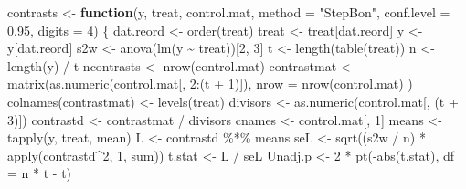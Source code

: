\documentclass[
]{book}
\newenvironment{Shaded}{\begin{snugshade}}{\end{snugshade}}
\newcommand{\AttributeTok}[1]{\textcolor[rgb]{0.77,0.63,0.00}{#1}}
\newcommand{\ControlFlowTok}[1]{\textcolor[rgb]{0.13,0.29,0.53}{\textbf{#1}}}
\newcommand{\DecValTok}[1]{\textcolor[rgb]{0.00,0.00,0.81}{#1}}
\newcommand{\FloatTok}[1]{\textcolor[rgb]{0.00,0.00,0.81}{#1}}
\newcommand{\FunctionTok}[1]{\textcolor[rgb]{0.00,0.00,0.00}{#1}}
\newcommand{\NormalTok}[1]{#1}
\newcommand{\OtherTok}[1]{\textcolor[rgb]{0.56,0.35,0.01}{#1}}
\newcommand{\SpecialCharTok}[1]{\textcolor[rgb]{0.00,0.00,0.00}{#1}}
\newcommand{\StringTok}[1]{\textcolor[rgb]{0.31,0.60,0.02}{#1}}
\begin{document}
\begin{Shaded}
\begin{Highlighting}[]
\NormalTok{contrasts }\OtherTok{\textless{}{-}} \ControlFlowTok{function}\NormalTok{(y, treat, control.mat, }\AttributeTok{method =} \StringTok{"StepBon"}\NormalTok{, }\AttributeTok{conf.level =} \FloatTok{0.95}\NormalTok{, }\AttributeTok{digits =} \DecValTok{4}\NormalTok{) \{}
\NormalTok{  dat.reord }\OtherTok{\textless{}{-}} \FunctionTok{order}\NormalTok{(treat)}
\NormalTok{  treat }\OtherTok{\textless{}{-}}\NormalTok{ treat[dat.reord]}
\NormalTok{  y }\OtherTok{\textless{}{-}}\NormalTok{ y[dat.reord]}
\NormalTok{  s2w }\OtherTok{\textless{}{-}} \FunctionTok{anova}\NormalTok{(}\FunctionTok{lm}\NormalTok{(y }\SpecialCharTok{\textasciitilde{}}\NormalTok{ treat))[}\DecValTok{2}\NormalTok{, }\DecValTok{3}\NormalTok{]}
\NormalTok{  t }\OtherTok{\textless{}{-}} \FunctionTok{length}\NormalTok{(}\FunctionTok{table}\NormalTok{(treat))}
\NormalTok{  n }\OtherTok{\textless{}{-}} \FunctionTok{length}\NormalTok{(y) }\SpecialCharTok{/}\NormalTok{ t}
\NormalTok{  ncontrasts }\OtherTok{\textless{}{-}} \FunctionTok{nrow}\NormalTok{(control.mat)}
\NormalTok{  contrastmat }\OtherTok{\textless{}{-}} \FunctionTok{matrix}\NormalTok{(}\FunctionTok{as.numeric}\NormalTok{(control.mat[, }\DecValTok{2}\SpecialCharTok{:}\NormalTok{(t }\SpecialCharTok{+} \DecValTok{1}\NormalTok{)]),}
    \AttributeTok{nrow =} \FunctionTok{nrow}\NormalTok{(control.mat)}
\NormalTok{  )}
  \FunctionTok{colnames}\NormalTok{(contrastmat) }\OtherTok{\textless{}{-}} \FunctionTok{levels}\NormalTok{(treat)}
\NormalTok{  divisors }\OtherTok{\textless{}{-}} \FunctionTok{as.numeric}\NormalTok{(control.mat[, (t }\SpecialCharTok{+} \DecValTok{3}\NormalTok{)])}
\NormalTok{  contrastd }\OtherTok{\textless{}{-}}\NormalTok{ contrastmat }\SpecialCharTok{/}\NormalTok{ divisors}
\NormalTok{  cnames }\OtherTok{\textless{}{-}}\NormalTok{ control.mat[, }\DecValTok{1}\NormalTok{]}
\NormalTok{  means }\OtherTok{\textless{}{-}} \FunctionTok{tapply}\NormalTok{(y, treat, mean)}
\NormalTok{  L }\OtherTok{\textless{}{-}}\NormalTok{ contrastd }\SpecialCharTok{\%*\%}\NormalTok{ means}
\NormalTok{  seL }\OtherTok{\textless{}{-}} \FunctionTok{sqrt}\NormalTok{((s2w }\SpecialCharTok{/}\NormalTok{ n) }\SpecialCharTok{*} \FunctionTok{apply}\NormalTok{(contrastd}\SpecialCharTok{\^{}}\DecValTok{2}\NormalTok{, }\DecValTok{1}\NormalTok{, sum))}
\NormalTok{  t.stat }\OtherTok{\textless{}{-}}\NormalTok{ L }\SpecialCharTok{/}\NormalTok{ seL}
\NormalTok{  Unadj.p }\OtherTok{\textless{}{-}} \DecValTok{2} \SpecialCharTok{*} \FunctionTok{pt}\NormalTok{(}\SpecialCharTok{{-}}\FunctionTok{abs}\NormalTok{(t.stat), }\AttributeTok{df =}\NormalTok{ n }\SpecialCharTok{*}\NormalTok{ t }\SpecialCharTok{{-}}\NormalTok{ t)}

\end{Highlighting}
\end{Shaded}
\end{document}
